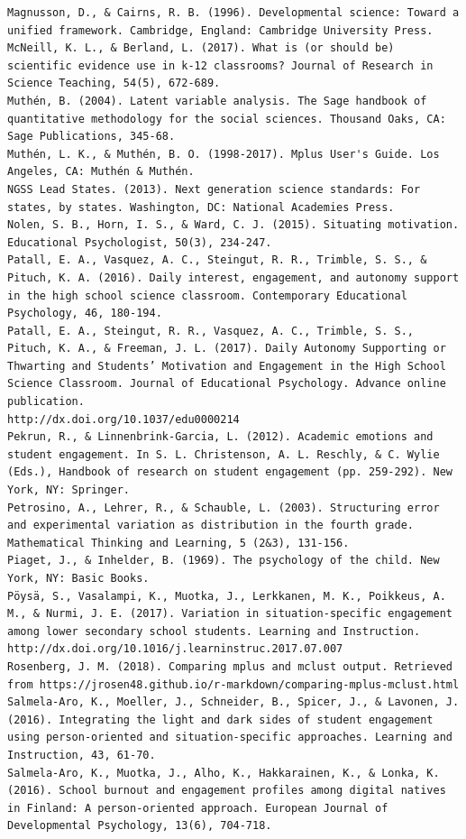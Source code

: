 \documentclass[]{book}
\theoremstyle{definition}
\theoremstyle{definition}
\theoremstyle{definition}
\theoremstyle{remark}
\begin{document}
\begin{verbatim}
Magnusson, D., & Cairns, R. B. (1996). Developmental science: Toward a unified framework. Cambridge, England: Cambridge University Press.  
McNeill, K. L., & Berland, L. (2017). What is (or should be) scientific evidence use in k‐12 classrooms? Journal of Research in Science Teaching, 54(5), 672-689.  
Muthén, B. (2004). Latent variable analysis. The Sage handbook of quantitative methodology for the social sciences. Thousand Oaks, CA: Sage Publications, 345-68.  
Muthén, L. K., & Muthén, B. O. (1998-2017). Mplus User's Guide. Los Angeles, CA: Muthén & Muthén.
NGSS Lead States. (2013). Next generation science standards: For states, by states. Washington, DC: National Academies Press.  
Nolen, S. B., Horn, I. S., & Ward, C. J. (2015). Situating motivation. Educational Psychologist, 50(3), 234-247.
Patall, E. A., Vasquez, A. C., Steingut, R. R., Trimble, S. S., & Pituch, K. A. (2016). Daily interest, engagement, and autonomy support in the high school science classroom. Contemporary Educational Psychology, 46, 180-194.  
Patall, E. A., Steingut, R. R., Vasquez, A. C., Trimble, S. S., Pituch, K. A., & Freeman, J. L. (2017). Daily Autonomy Supporting or Thwarting and Students’ Motivation and Engagement in the High School Science Classroom. Journal of Educational Psychology. Advance online publication.
http://dx.doi.org/10.1037/edu0000214  
Pekrun, R., & Linnenbrink-Garcia, L. (2012). Academic emotions and student engagement. In S. L. Christenson, A. L. Reschly, & C. Wylie (Eds.), Handbook of research on student engagement (pp. 259-292). New York, NY: Springer.
Petrosino, A., Lehrer, R., & Schauble, L. (2003). Structuring error and experimental variation as distribution in the fourth grade. Mathematical Thinking and Learning, 5 (2&3), 131-156.  
Piaget, J., & Inhelder, B. (1969). The psychology of the child. New York, NY: Basic Books.  
Pöysä, S., Vasalampi, K., Muotka, J., Lerkkanen, M. K., Poikkeus, A. M., & Nurmi, J. E. (2017). Variation in situation-specific engagement among lower secondary school students. Learning and Instruction. http://dx.doi.org/10.1016/j.learninstruc.2017.07.007  
Rosenberg, J. M. (2018). Comparing mplus and mclust output. Retrieved from https://jrosen48.github.io/r-markdown/comparing-mplus-mclust.html
Salmela-Aro, K., Moeller, J., Schneider, B., Spicer, J., & Lavonen, J. (2016). Integrating the light and dark sides of student engagement using person-oriented and situation-specific approaches. Learning and Instruction, 43, 61-70.  
Salmela-Aro, K., Muotka, J., Alho, K., Hakkarainen, K., & Lonka, K. (2016). School burnout and engagement profiles among digital natives in Finland: A person-oriented approach. European Journal of Developmental Psychology, 13(6), 704-718.  

\end{verbatim}
\end{document}
